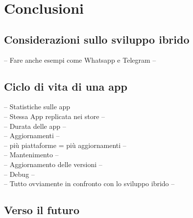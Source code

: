 \chapter{Conclusioni}

\section{Considerazioni sullo sviluppo ibrido}

-- Fare anche esempi come Whatsapp e Telegram --\\

\section{Ciclo di vita di una app}
-- Statistiche sulle app\\
	-- Stessa App replicata nei store --\\
	-- Durata delle app --\\
-- Aggiornamenti --\\
	-- più piattaforme = più aggiornamenti --\\
-- Mantenimento --\\
	-- Aggiornamento delle versioni --\\
	-- Debug --\\
-- Tutto ovviamente in confronto con lo sviluppo ibrido --

\section{Verso il futuro}